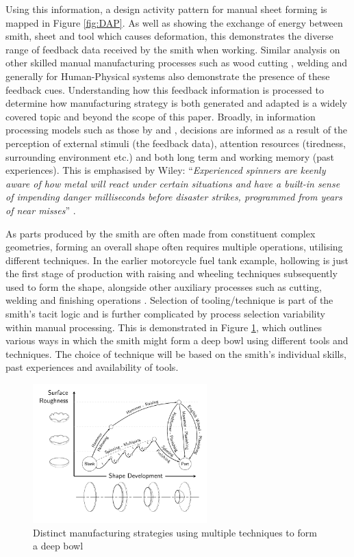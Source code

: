Using this information, a design activity pattern for manual sheet forming is mapped in Figure \ref{fig:DAP}. As well as showing the exchange of energy between smith, sheet and tool which causes deformation, this demonstrates the diverse range of feedback data received by the smith when working. Similar analysis on other skilled manual manufacturing processes such as wood cutting \citep{Roth1981FoundationDesign}, welding \citep{Zhang2012ModelingPrinciples} and generally for Human-Physical systems \cite{Zhou2018TowardManufacturing} also demonstrate the presence of these feedback cues. Understanding how this feedback information is processed to determine how manufacturing strategy is both generated and adapted is a widely covered topic and beyond the scope of this paper. Broadly, in information processing models such as those by \cite{Wickens2015EngineeringPerformance} and \cite{Endsley1995TowardSystems}, decisions are informed as a result of the perception of external stimuli (the feedback data), attention resources (tiredness, surrounding environment etc.) and both long term and working memory (past experiences). This is emphasised by Wiley: ``\textit{Experienced spinners are keenly aware of how metal will react under certain situations and have a built-in sense of impending danger milliseconds before disaster strikes, programmed from years of near misses}'' \citep{Wiley2004TheHand-spinning}.  

As parts produced by the smith are often made from constituent complex geometries, forming an overall shape often requires multiple operations, utilising different techniques. In the earlier motorcycle fuel tank example, hollowing is just the first stage of production with raising and wheeling techniques subsequently used to form the shape, alongside other auxiliary processes such as cutting, welding and finishing operations \citep{Barr2013ProfessionalFabrication}. Selection of tooling/technique is part of the smith's tacit logic and is further complicated by process selection variability within manual processing. This is demonstrated in Figure \ref{fig:ShapeDevBow}, which outlines various ways in which the smith might form a deep bowl using different tools and techniques. The choice of technique will be based on the smith’s individual skills, past experiences and availability of tools. 

\begin{figure}[h]
    \centering
    \includegraphics[width=0.6\textwidth]{Images/Bowlv2.pdf}
    \caption{Distinct manufacturing strategies using multiple techniques to form a deep bowl}
    \label{fig:ShapeDevBow}
\end{figure}

